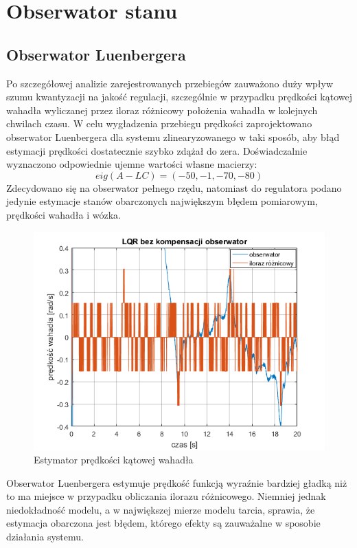 \section{Obserwator stanu}
\subsection{Obserwator Luenbergera}
Po szczegółowej analizie zarejestrowanych przebiegów zauważono duży wpływ szumu kwantyzacji na jakość regulacji, szczególnie w przypadku prędkości kątowej wahadła wyliczanej przez iloraz różnicowy położenia wahadła w kolejnych chwilach czasu. W celu wygładzenia przebiegu prędkości zaprojektowano obserwator Luenbergera dla systemu zlinearyzowanego w taki sposób, aby błąd estymacji prędkości dostatecznie szybko zdążał do zera. Doświadczalnie wyznaczono odpowiednie ujemne wartości własne macierzy:
\begin{equation}  
eig(A-LC) = (-50,-1,-70,-80)
\end{equation} 
Zdecydowano się na obserwator pełnego rzędu, natomiast do regulatora podano jedynie estymacje stanów obarczonych największym błędem pomiarowym, prędkości wahadła i wózka.
\begin{figure}[H]
\centering
\label{fig:observ}
\includegraphics[width=14cm]{obrazy/pendulum/observ.png}
\caption{Estymator prędkości kątowej wahadła}
\end{figure}
Obserwator Luenbergera estymuje prędkość funkcją wyraźnie bardziej gładką niż to ma miejsce w przypadku obliczania ilorazu różnicowego. Niemniej jednak niedokładność modelu, a w największej mierze modelu tarcia, sprawia, że estymacja obarczona jest błędem, którego efekty są zauważalne w sposobie działania systemu.

